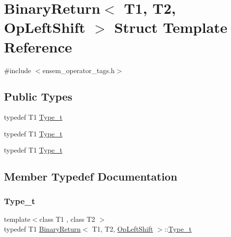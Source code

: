 \hypertarget{structBinaryReturn_3_01T1_00_01T2_00_01OpLeftShift_01_4}{}\section{Binary\+Return$<$ T1, T2, Op\+Left\+Shift $>$ Struct Template Reference}
\label{structBinaryReturn_3_01T1_00_01T2_00_01OpLeftShift_01_4}


{\ttfamily \#include $<$ensem\+\_\+operator\+\_\+tags.\+h$>$}

\subsection*{Public Types}
\begin{DoxyCompactItemize}
\item 
typedef T1 \mbox{\hyperlink{structBinaryReturn_3_01T1_00_01T2_00_01OpLeftShift_01_4_a49e088c9b6e38646dc1ee380d7c79c39}{Type\+\_\+t}}
\item 
typedef T1 \mbox{\hyperlink{structBinaryReturn_3_01T1_00_01T2_00_01OpLeftShift_01_4_a49e088c9b6e38646dc1ee380d7c79c39}{Type\+\_\+t}}
\item 
typedef T1 \mbox{\hyperlink{structBinaryReturn_3_01T1_00_01T2_00_01OpLeftShift_01_4_a49e088c9b6e38646dc1ee380d7c79c39}{Type\+\_\+t}}
\end{DoxyCompactItemize}


\subsection{Member Typedef Documentation}
\mbox{\label{structBinaryReturn_3_01T1_00_01T2_00_01OpLeftShift_01_4_a49e088c9b6e38646dc1ee380d7c79c39}} 
\subsubsection{\texorpdfstring{Type\_t}{Type\_t}\hspace{0.1cm}{\footnotesize\ttfamily [1/3]}}
{\footnotesize\ttfamily template$<$class T1 , class T2 $>$ \\
typedef T1 \mbox{\hyperlink{structBinaryReturn}{Binary\+Return}}$<$ T1, T2, \mbox{\hyperlink{structOpLeftShift}{Op\+Left\+Shift}} $>$\+::\mbox{\hyperlink{structBinaryReturn_3_01T1_00_01T2_00_01OpLeftShift_01_4_a49e088c9b6e38646dc1ee380d7c79c39}{Type\+\_\+t}}}

